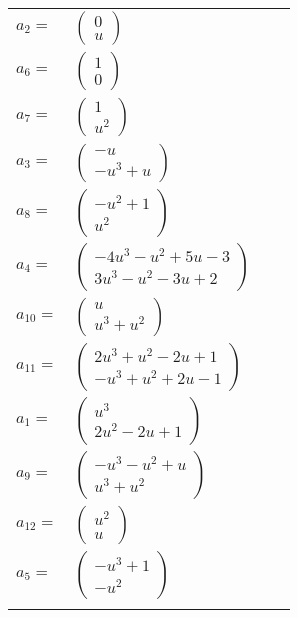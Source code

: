 \documentclass[1p]{elsarticle_modified}
\theoremstyle{definition}
\begin{document}
\begin{tabular}{m{7pt} m{180pt} m{7pt} m{180pt} }
\flushright $a_{2}=$&$\begin{pmatrix}0\\u\end{pmatrix}$ \\
\flushright $a_{6}=$&$\begin{pmatrix}1\\0\end{pmatrix}$ \\
\flushright $a_{7}=$&$\begin{pmatrix}1\\u^2\end{pmatrix}$ \\
\flushright $a_{3}=$&$\begin{pmatrix}- u\\- u^3+u\end{pmatrix}$ \\
\flushright $a_{8}=$&$\begin{pmatrix}- u^2+1\\u^2\end{pmatrix}$ \\
\flushright $a_{4}=$&$\begin{pmatrix}-4 u^3- u^2+5 u-3\\3 u^3- u^2-3 u+2\end{pmatrix}$ \\
\flushright $a_{10}=$&$\begin{pmatrix}u\\u^3+u^2\end{pmatrix}$ \\
\flushright $a_{11}=$&$\begin{pmatrix}2 u^3+u^2-2 u+1\\- u^3+u^2+2 u-1\end{pmatrix}$ \\
\flushright $a_{1}=$&$\begin{pmatrix}u^3\\2 u^2-2 u+1\end{pmatrix}$ \\
\flushright $a_{9}=$&$\begin{pmatrix}- u^3- u^2+u\\u^3+u^2\end{pmatrix}$ \\
\flushright $a_{12}=$&$\begin{pmatrix}u^2\\u\end{pmatrix}$ \\
\flushright $a_{5}=$&$\begin{pmatrix}- u^3+1\\- u^2\end{pmatrix}$\\&\end{tabular}
\end{document}
